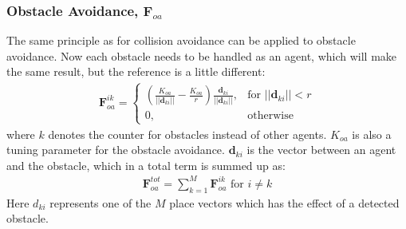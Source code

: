 \subsubsection{Obstacle Avoidance, $\mathbf{F}_{oa}$}
The same principle as for collision avoidance can be applied to
obstacle avoidance. Now each obstacle needs to be handled as an agent,
which will make the same result, but the reference is a little
different:
\begin{align}
    \mathbf{F}_{oa}^{ik}= 
\begin{cases}
    \left( \frac{K_{oa}}{||\mathbf{d}_{ki}||}-\frac{K_{oa}}{r}\right)
		\frac{\mathbf{d}_{{ki}}}{||\mathbf{d}_{ki}||},& \text{for } ||\mathbf{d}_{ki}||<r\\
    0,              & \text{otherwise}
\end{cases}
\end{align}
where $k$ denotes the counter for obstacles instead of other agents.
$K_{oa}$ is also a tuning parameter for the obstacle avoidance.
$\mathbf{d}_{ki}$ is the vector between an agent and the obstacle, which in a
total term is summed up as:
\begin{align}
\mathbf{F}_{oa}^{tot} = \sum\limits_{k=1}^M\mathbf{F}_{oa}^{ik} \text{ for } i\neq k
\end{align}
Here $d_{ki}$ represents one of the $M$ place vectors which has the
effect of a detected obstacle.

